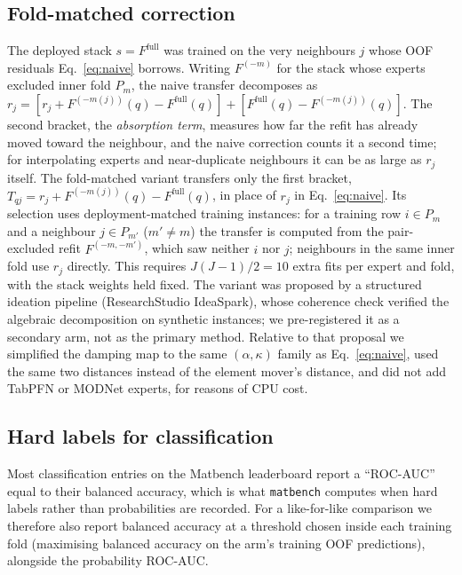 \subsection{Fold-matched correction}
\label{sec:fm}
The deployed stack $s=F^{\mathrm{full}}$ was trained on the very neighbours $j$ whose OOF residuals Eq.~\eqref{eq:naive} borrows.
Writing $F^{(-m)}$ for the stack whose experts excluded inner fold $P_m$, the naive transfer decomposes as $r_j = [r_j + F^{(-m(j))}(q) - F^{\mathrm{full}}(q)] + [F^{\mathrm{full}}(q)-F^{(-m(j))}(q)]$.
The second bracket, the \emph{absorption term}, measures how far the refit has already moved toward the neighbour, and the naive correction counts it a second time; for interpolating experts and near-duplicate neighbours it can be as large as $r_j$ itself.
The fold-matched variant transfers only the first bracket, $T_{qj}=r_j + F^{(-m(j))}(q) - F^{\mathrm{full}}(q)$, in place of $r_j$ in Eq.~\eqref{eq:naive}.
Its selection uses deployment-matched training instances: for a training row $i\in P_m$ and a neighbour $j\in P_{m'}$ ($m'\neq m$) the transfer is computed from the pair-excluded refit $F^{(-m,-m')}$, which saw neither $i$ nor $j$; neighbours in the same inner fold use $r_j$ directly.
This requires $J(J-1)/2=10$ extra fits per expert and fold, with the stack weights held fixed.
The variant was proposed by a structured ideation pipeline (ResearchStudio IdeaSpark), whose coherence check verified the algebraic decomposition on synthetic instances; we pre-registered it as a secondary arm, not as the primary method.
Relative to that proposal we simplified the damping map to the same $(\alpha,\kappa)$ family as Eq.~\eqref{eq:naive}, used the same two distances instead of the element mover's distance, and did not add TabPFN or MODNet experts, for reasons of CPU cost.

\subsection{Hard labels for classification}
Most classification entries on the Matbench leaderboard report a ``ROC-AUC'' equal to their balanced accuracy, which is what \texttt{matbench} computes when hard labels rather than probabilities are recorded.
For a like-for-like comparison we therefore also report balanced accuracy at a threshold chosen inside each training fold (maximising balanced accuracy on the arm's training OOF predictions), alongside the probability ROC-AUC.

